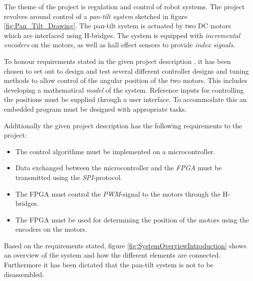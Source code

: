\documentclass[../../main.tex]{subfiles}
\begin{document}
The theme of the project is regulation and control of robot systems. The project revolves around control of a \textit{pan-tilt system} sketched in figure \ref{fig:Pan_Tilt_Drawing}. 
The pan-tilt system is actuated by two DC motors which are interfaced using H-bridges. The system is equipped with \textit{incremental encoders} on the motors, as well as hall effect sensors to provide \textit{index signals}.

To honour requirements stated in the given project description \cite{christoffersloth}, it has been chosen to set out to design and test several different controller designs and tuning methods to allow control of the angular position of the two motors. This includes developing a mathematical \textit{model} of the system. Reference inputs for controlling the positions must be supplied through a user interface. To accommodate this an embedded program must be designed with appropriate tasks.

Additionally the given project description has the following requirements to the project:

\begin{itemize}
    \item The control algorithms must be implemented on a microcontroller.
    \item Data exchanged between the microcontroller and the \textit{FPGA} must be transmitted using the \textit{SPI}-protocol. 
    \item The FPGA must control the \textit{PWM}-signal to the motors through the H-bridges.
    \item The FPGA must be used for determining the position of the motors using the encoders on the motors.
\end{itemize}

Based on the requirements stated, figure \ref{fig:SystemOverviewIntroduction} shows an overview of the system and how the different elements are connected. Furthermore it has been dictated that the pan-tilt system is not to be disassembled.  


\end{document}
